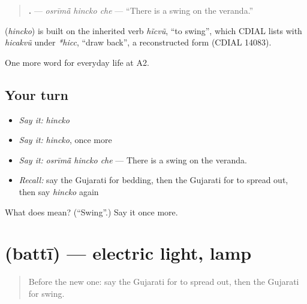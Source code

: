 \begin{quote}
\textbf{  .} — \emph{osrīmā̃ hincko che} — \textquotedblleft{}There is a swing on the veranda.\textquotedblright{}
\end{quote}

\begin{cousinweb}
\textbf{} (\emph{hincko}) is built on the inherited verb \emph{hĩcvũ}, \textquotedblleft{}to swing\textquotedblright{}, which CDIAL lists with \emph{hicakvũ} under \emph{*hicc}, \textquotedblleft{}draw back\textquotedblright{}, a reconstructed form (CDIAL 14083).
\end{cousinweb}

\begin{grammarlens}[title={What you've built}]
One more word for everyday life at A2.
\end{grammarlens}

\subsection*{Your turn}
\begin{itemize}
\raggedright
  \item \emph{Say it:} \emph{hincko}
  \item \emph{Say it:} \emph{hincko}, once more
  \item \emph{Say it:} \emph{osrīmā̃ hincko che} — There is a swing on the veranda.
  \item \emph{Recall:} say the Gujarati for bedding, then the Gujarati for to spread out, then say \emph{hincko} again
\end{itemize}

\begin{tcolorbox}[breakable,colback=teal!4,colframe=teal!35!black,title={Before you move on}]
What does  mean? (\textquotedblleft{}Swing\textquotedblright{}.) Say it once more.
\end{tcolorbox}
\section[\texorpdfstring{\gu{બત્તી} (battī)}{બત્તી (battī)}]{ (battī) — electric light, lamp}

\label{lesson:GU-C160-batti}



\begin{quote}
Before the new one: say the Gujarati for to spread out, then the Gujarati for swing.
\end{quote}

